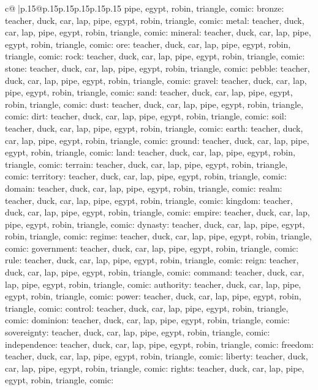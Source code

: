 \documentclass{article}
\begin{document}
{\begin{supertabular}{c@{$\;$}|p{.15\linewidth}@{}p{.15\linewidth}p{.15\linewidth}p{.15\linewidth}p{.15\linewidth}p{.15\linewidth}}
{{{pipe, egypt, robin, triangle, comic\n\nCLUE: bronze\nTARGETS: teacher, duck, car, lap, pipe, egypt, robin, triangle, comic\n\nCLUE: metal\nTARGETS: teacher, duck, car, lap, pipe, egypt, robin, triangle, comic\n\nCLUE: mineral\nTARGETS: teacher, duck, car, lap, pipe, egypt, robin, triangle, comic\n\nCLUE: ore\nTARGETS: teacher, duck, car, lap, pipe, egypt, robin, triangle, comic\n\nCLUE: rock\nTARGETS: teacher, duck, car, lap, pipe, egypt, robin, triangle, comic\n\nCLUE: stone\nTARGETS: teacher, duck, car, lap, pipe, egypt, robin, triangle, comic\n\nCLUE: pebble\nTARGETS: teacher, duck, car, lap, pipe, egypt, robin, triangle, comic\n\nCLUE: gravel\nTARGETS: teacher, duck, car, lap, pipe, egypt, robin, triangle, comic\n\nCLUE: sand\nTARGETS: teacher, duck, car, lap, pipe, egypt, robin, triangle, comic\n\nCLUE: dust\nTARGETS: teacher, duck, car, lap, pipe, egypt, robin, triangle, comic\n\nCLUE: dirt\nTARGETS: teacher, duck, car, lap, pipe, egypt, robin, triangle, comic\n\nCLUE: soil\nTARGETS: teacher, duck, car, lap, pipe, egypt, robin, triangle, comic\n\nCLUE: earth\nTARGETS: teacher, duck, car, lap, pipe, egypt, robin, triangle, comic\n\nCLUE: ground\nTARGETS: teacher, duck, car, lap, pipe, egypt, robin, triangle, comic\n\nCLUE: land\nTARGETS: teacher, duck, car, lap, pipe, egypt, robin, triangle, comic\n\nCLUE: terrain\nTARGETS: teacher, duck, car, lap, pipe, egypt, robin, triangle, comic\n\nCLUE: territory\nTARGETS: teacher, duck, car, lap, pipe, egypt, robin, triangle, comic\n\nCLUE: domain\nTARGETS: teacher, duck, car, lap, pipe, egypt, robin, triangle, comic\n\nCLUE: realm\nTARGETS: teacher, duck, car, lap, pipe, egypt, robin, triangle, comic\n\nCLUE: kingdom\nTARGETS: teacher, duck, car, lap, pipe, egypt, robin, triangle, comic\n\nCLUE: empire\nTARGETS: teacher, duck, car, lap, pipe, egypt, robin, triangle, comic\n\nCLUE: dynasty\nTARGETS: teacher, duck, car, lap, pipe, egypt, robin, triangle, comic\n\nCLUE: regime\nTARGETS: teacher, duck, car, lap, pipe, egypt, robin, triangle, comic\n\nCLUE: government\nTARGETS: teacher, duck, car, lap, pipe, egypt, robin, triangle, comic\n\nCLUE: rule\nTARGETS: teacher, duck, car, lap, pipe, egypt, robin, triangle, comic\n\nCLUE: reign\nTARGETS: teacher, duck, car, lap, pipe, egypt, robin, triangle, comic\n\nCLUE: command\nTARGETS: teacher, duck, car, lap, pipe, egypt, robin, triangle, comic\n\nCLUE: authority\nTARGETS: teacher, duck, car, lap, pipe, egypt, robin, triangle, comic\n\nCLUE: power\nTARGETS: teacher, duck, car, lap, pipe, egypt, robin, triangle, comic\n\nCLUE: control\nTARGETS: teacher, duck, car, lap, pipe, egypt, robin, triangle, comic\n\nCLUE: dominion\nTARGETS: teacher, duck, car, lap, pipe, egypt, robin, triangle, comic\n\nCLUE: sovereignty\nTARGETS: teacher, duck, car, lap, pipe, egypt, robin, triangle, comic\n\nCLUE: independence\nTARGETS: teacher, duck, car, lap, pipe, egypt, robin, triangle, comic\n\nCLUE: freedom\nTARGETS: teacher, duck, car, lap, pipe, egypt, robin, triangle, comic\n\nCLUE: liberty\nTARGETS: teacher, duck, car, lap, pipe, egypt, robin, triangle, comic\n\nCLUE: rights\nTARGETS: teacher, duck, car, lap, pipe, egypt, robin, triangle, comic\n\nCLUE: }}}
\end{supertabular}}
\end{document}
